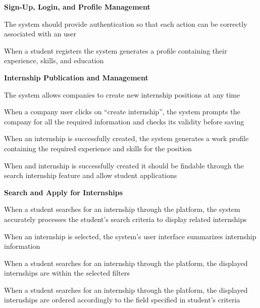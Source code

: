 \begin{enumerate}[label={[R\arabic*]}]
\item[] \textbf{Sign-Up, Login, and Profile Management}


\item The system should provide authentication so that each action can be correctly associated with an user


\item When a student registers the system generates a profile containing their experience, skills, and education


\item[] \textbf{Internship Publication and Management}


\item The system allows companies to create new internship positions at any time


\item When a company user clicks on “create internship”, the system prompts the company for all the required information and checks its validity before saving


\item When an internship is successfully created, the system generates a work profile containing the required experience and skills for the position

 
\item When and internship is successfully created it should be findable through the search internship feature and allow student applications

\item[] \textbf{Search and Apply for Internships}


\item When a student searches for an internship through the platform, the system accurately processes the student’s search criteria to display related internships


\item When an internship is selected, the system’s user interface summarizes internship information


\item When a student searches for an internship through the platform, the displayed internships  are within the selected filters


\item When a student searches for an internship through the platform, the displayed internships are ordered accordingly to the field specified in student’s criteria


\end{enumerate}
